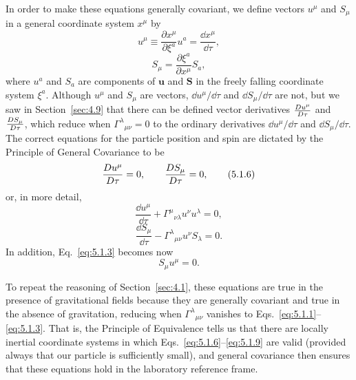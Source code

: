 In order to make these equations generally covariant, we define vectors
\(u^\mu\) and \(S_\mu\) in a general coordinate system \(x^\mu\) by
\begin{equation}
  u^\mu
  \equiv
  \frac{\partial x^\mu}{\partial\xi^a}u^a
  =
  \frac{\dd x^\mu}{\dd\tau},
  \tag{5.1.4}\label{eq:5.1.4}
\end{equation}
\begin{equation}
  S_\mu
  =
  \frac{\partial\xi^a}{\partial x^\mu}S_a,
  \tag{5.1.5}\label{eq:5.1.5}
\end{equation}
where \(u^a\) and \(S_a\) are components of \(\mathbf u\) and \(\mathbf S\)
in the freely falling coordinate system \(\xi^a\). Although \(u^\mu\) and
\(S_\mu\) are vectors, \(\dd u^\mu/\dd\tau\) and
\(\dd S_\mu/\dd\tau\) are not, but we saw in Section~\ref{sec:4.9} that
there can be defined vector derivatives \(\frac{D u^\mu}{D\tau}\) and
\(\frac{D S_\mu}{D\tau}\), which reduce when
\(\Gamma^\lambda{}_{\mu\nu}=0\) to the ordinary derivatives
\(\dd u^\mu/\dd\tau\) and \(\dd S_\mu/\dd\tau\). The correct equations for
the particle position and spin are dictated by the Principle of General
Covariance to be
\begin{equation}
  \frac{D u^\mu}{D\tau}=0,
  \qquad
  \frac{D S_\mu}{D\tau}=0,
  \tag{5.1.6}\label{eq:5.1.6}
\end{equation}
or, in more detail,
\begin{equation}
  \frac{\dd u^\mu}{\dd\tau}
  +
  \Gamma^\mu{}_{\nu\lambda}u^\nu u^\lambda
  =0,
  \tag{5.1.7}\label{eq:5.1.7}
\end{equation}
\begin{equation}
  \frac{\dd S_\mu}{\dd\tau}
  -
  \Gamma^\lambda{}_{\mu\nu}u^\nu S_\lambda
  =0.
  \tag{5.1.8}\label{eq:5.1.8}
\end{equation}
In addition, Eq.~\eqref{eq:5.1.3} becomes now
\begin{equation}
  S_\mu u^\mu=0.
  \tag{5.1.9}\label{eq:5.1.9}
\end{equation}

To repeat the reasoning of Section~\ref{sec:4.1}, these equations are true in
the presence of gravitational fields because they are generally covariant and
true in the absence of gravitation, reducing when
\(\Gamma^\lambda{}_{\mu\nu}\) vanishes to
Eqs.~\eqref{eq:5.1.1}--\eqref{eq:5.1.3}. That is, the Principle of
Equivalence tells us that there are locally inertial coordinate systems in
which Eqs.~\eqref{eq:5.1.6}--\eqref{eq:5.1.9} are valid (provided always
that our particle is sufficiently small), and general covariance then ensures
that these equations hold in the laboratory reference frame.

